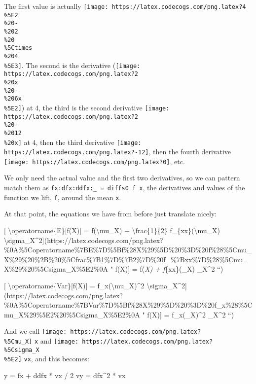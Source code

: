 \documentclass[]{article}
\newenvironment{Shaded}{}{}
\newcommand{\DecValTok}[1]{\textcolor[rgb]{0.25,0.63,0.44}{#1}}
\newcommand{\FunctionTok}[1]{\textcolor[rgb]{0.02,0.16,0.49}{#1}}
\newcommand{\NormalTok}[1]{#1}
\begin{document}
The first value is actually
\texttt{[image: https://latex.codecogs.com/png.latex?4\\\%5E2\\\%20-\\\%202\\\%20\\\%5Ctimes\\\%204\\\%5E3]}.
The second is the derivative
(\texttt{[image: https://latex.codecogs.com/png.latex?2\\\%20x\\\%20-\\\%206x\\\%5E2]})
at 4, the third is the second derivative
\texttt{[image: https://latex.codecogs.com/png.latex?2\\\%20-\\\%2012\\\%20x]} at 4,
then the third derivative
\texttt{[image: https://latex.codecogs.com/png.latex?-12]}, then the fourth
derivative \texttt{[image: https://latex.codecogs.com/png.latex?0]}, etc.

We only need the actual value and the first two derivatives, so we can pattern
match them as \texttt{fx:dfx:ddfx:\_\ =\ diffs0\ f\ x}, the derivatives and
values of the function we lift, \texttt{f}, around the mean \texttt{x}.

At that point, the equations we have from before just translate nicely:

{[} \textbackslash{}operatorname\{E\}{[}f(X){]} = f(\textbackslash{}mu\_X) +
\textbackslash{}frac\{1\}\{2\} f\_\{xx\}(\textbackslash{}mu\_X)
\textbackslash{}sigma\_X\^{}2{]}(https://latex.codecogs.com/png.latex?\%0A\%5Coperatorname\%7BE\%7D\%5Bf\%28X\%29\%5D\%20\%3D\%20f\%28\%5Cmu\_X\%29\%20\%2B\%20\%5Cfrac\%7B1\%7D\%7B2\%7D\%20f\_\%7Bxx\%7D\%28\%5Cmu\_X\%29\%20\%5Csigma\_X\%5E2\%0A
" \operatorname{E}{[}f(X){]} = f(\mu\emph{X) +  f}\{xx\}(\mu\_X)
\sigma\_X\^{}2 ``)

{[} \textbackslash{}operatorname\{Var\}{[}f(X){]} =
f\_x(\textbackslash{}mu\_X)\^{}2
\textbackslash{}sigma\_X\^{}2{]}(https://latex.codecogs.com/png.latex?\%0A\%5Coperatorname\%7BVar\%7D\%5Bf\%28X\%29\%5D\%20\%3D\%20f\_x\%28\%5Cmu\_X\%29\%5E2\%20\%5Csigma\_X\%5E2\%0A
" \operatorname{Var}{[}f(X){]} = f\_x(\mu\_X)\^{}2 \sigma\_X\^{}2 ``)

And we call \texttt{[image: https://latex.codecogs.com/png.latex?\\\%5Cmu\_X]}
\texttt{x} and
\texttt{[image: https://latex.codecogs.com/png.latex?\\\%5Csigma\_X\\\%5E2]}
\texttt{vx}, and this becomes:

\begin{Shaded}
\begin{Highlighting}[]
\NormalTok{y  }\FunctionTok{=}\NormalTok{ fx }\FunctionTok{+}\NormalTok{ ddfx }\FunctionTok{*}\NormalTok{ vx }\FunctionTok{/} \DecValTok{2}
\NormalTok{vy }\FunctionTok{=}\NormalTok{ dfx}\FunctionTok{^}\DecValTok{2} \FunctionTok{*}\NormalTok{ vx}
\end{Highlighting}
\end{Shaded}
\end{document}
